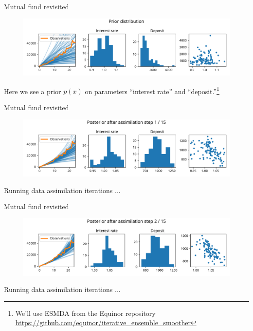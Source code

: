 \documentclass[12pt, aspectratio=149]{beamer}
\theoremstyle{plain}
\begin{document}
\begin{frame}[fragile]{Mutual fund revisited}
\vspace*{-1em}
\begin{center}
 \begin{figure}
    	\centering
    	\includegraphics[width=0.99\linewidth]{figures/esmda_prior_no_truth.pdf}
 \end{figure}
 Here we see a prior $p(x)$ on parameters ``interest rate'' and ``deposit.''\footnote{We'll use ESMDA from the Equinor repository\\ \href{https://github.com/equinor/iterative_ensemble_smoother}{https://github.com/equinor/iterative\_ensemble\_smoother}}
 \end{center}
\end{frame}

\begin{frame}[fragile]{Mutual fund revisited}
\vspace*{-1em}
\begin{center}
 \begin{figure}
    	\centering
    	\includegraphics[width=0.99\linewidth]{figures/esmda_step_1.pdf}
 \end{figure}
  Running data assimilation iterations ...
 \end{center}
\end{frame}

\begin{frame}[fragile]{Mutual fund revisited}
\vspace*{-1em}
\begin{center}
 \begin{figure}
    	\centering
    	\includegraphics[width=0.99\linewidth]{figures/esmda_step_2.pdf}
 \end{figure}
   Running data assimilation iterations ...
 \end{center}
\end{frame}
\end{document}
